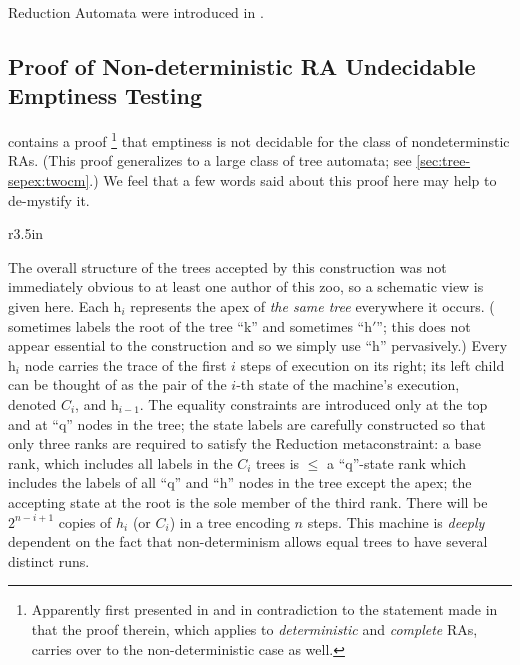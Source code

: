 Reduction Automata were introduced in \cite{dauchet:reduction}.



\subsection{Proof of Non-deterministic RA Undecidable Emptiness Testing}

\cite[Thm 4.4.7]{tata} contains a proof%
%
\footnote{Apparently first presented in \cite[Appendix
C]{jacquemard:tamodeq} and in contradiction to the statement made in
\cite[\S 4.1]{dauchet:reduction} that the proof therein, which applies to
{\em deterministic} and {\em complete} RAs, carries over to the
non-deterministic case as well.}
%
that emptiness is not decidable for the class of nondeterminstic RAs.  (This
proof generalizes to a large class of tree automata; see
\autoref{sec:tree-sepex:twocm}.)  We feel that a few words said about this
proof here may help to de-mystify it.

\begin{wrapfigure}{r}{3.5in}\centering{}\end{wrapfigure}

The overall structure of the trees accepted by this construction was not
immediately obvious to at least one author of this zoo, so a schematic view
is given here.  Each h$_i$ represents the apex of {\em the same tree}
everywhere it occurs.  (\cite{tata} sometimes labels the root of the tree
``k'' and sometimes ``h$'$''; this does not appear essential to the
construction and so we simply use ``h'' pervasively.)  Every h$_i$ node
carries the trace of the first $i$ steps of execution on its right; its left
child can be thought of as the pair of the $i$-th state of the machine's
execution, denoted $C_i$, and h$_{i-1}$.  The equality constraints are
introduced only at the top and at ``q'' nodes in the tree; the state labels
are carefully constructed so that only three ranks are required to satisfy
the Reduction metaconstraint: a base rank, which includes all labels in the
$C_i$ trees is $\le$ a ``q''-state rank which includes the labels of all
``q'' and ``h'' nodes in the tree except the apex; the accepting state at
the root is the sole member of the third rank.  There will be $2^{n-i+1}$
copies of $h_i$ (or $C_i$) in a tree encoding $n$ steps.  This machine is
{\em deeply} dependent on the fact that non-determinism allows equal trees
to have several distinct runs. 
